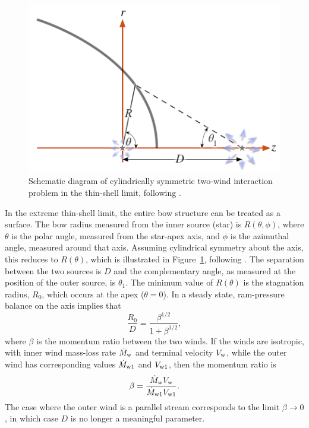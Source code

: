 \begin{figure}
  \centering
  \includegraphics[width=\linewidth]{figs/bowshock-crw-variables}
  \caption[]{Schematic diagram of cylindrically symmetric two-wind
    interaction problem in the thin-shell limit, following
    \citet{Canto:1996}.}
  \label{fig:crw-schema}
\end{figure}
In the extreme thin-shell limit, the entire bow structure can be
treated as a surface.  The bow radius measured from the inner source
(star) is \(R(\theta, \phi)\), where \(\theta\) is the polar angle, measured from
the star-apex axis, and \(\phi\) is the azimuthal angle, measured around
that axis.  Assuming cylindrical symmetry about the axis, this reduces
to \(R(\theta)\), which is illustrated in Figure~\ref{fig:crw-schema},
following \citet{Canto:1996}.  The separation between the two sources
is \(D\) and the complementary angle, as measured at the position of
the outer source, is \(\theta_1\).  The minimum value of \(R(\theta)\) is the
stagnation radius, \(R_0\), which occurs at the apex (\(\theta = 0\)).  In
a steady state, ram-pressure balance on the axis implies that
\begin{equation}
  \label{eq:stagnation-radius}
  \frac{R_0} {D} = \frac{\beta^{1/2}} {1 + \beta^{1/2}} ,
\end{equation}
where \(\beta\) is the momentum ratio between the two winds.  If the winds
are isotropic, with inner wind mass-loss rate \(\dot{M}_{\mathrm{w}}\) and
terminal velocity \(V_{\mathrm{w}}\), while the outer wind has corresponding
values \(\dot{M}_{\mathrm{w}1}\) and \(V_{\mathrm{w}1}\), then the momentum ratio is
\begin{equation}
  \label{eq:beta-definition}
  \beta = \frac{\dot{M}_{\mathrm{w}} V_{\mathrm{w}}} {\dot{M}_{\mathrm{w}1} V_{\mathrm{w}1}} .
\end{equation}
The case where the outer wind is a parallel stream
\citep{Wilkin:1996a} corresponds to the limit \(\beta \to 0\), in which case
\(D\) is no longer a meaningful parameter.

